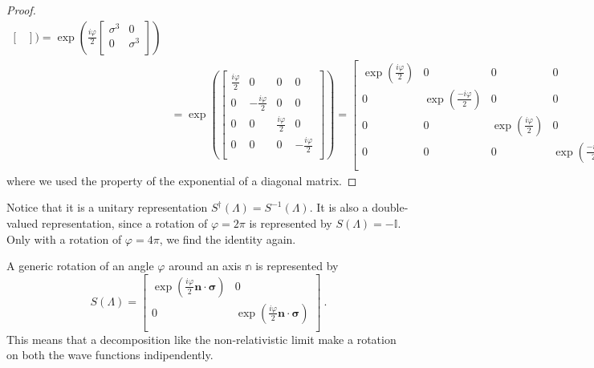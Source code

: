 \begin{example}
\begin{proof}
\begin{equation*}
\begin{aligned}
\begin{bmatrix}
                \end{bmatrix})  = \exp(\frac{i \varphi}{2} \begin{bmatrix}
                    \sigma^3 & 0 \\ 0 & \sigma^3 \\
                \end{bmatrix}) \\ & = \exp(\begin{bmatrix}
                    \frac{i \varphi}{2} & 0 & 0 & 0 \\
                    0 & - \frac{i \varphi}{2} & 0 & 0 \\
                    0 & 0 & \frac{i \varphi}{2} & 0 \\
                    0 & 0 & 0 & -\frac{i \varphi}{2} \\
                \end{bmatrix}) = \begin{bmatrix}
                    \exp(\frac{i \varphi}{2}) & 0 & 0 & 0 \\ 
                    0 & \exp(\frac{-i \varphi}{2}) & 0 & 0 \\ 
                    0 & 0 & \exp(\frac{i \varphi}{2}) & 0 \\ 
                    0 & 0 & 0 & \exp(\frac{-i \varphi}{2}) \\
                \end{bmatrix} ~,
            \end{aligned}
            \end{equation*}
            where we used the property of the exponential of a diagonal matrix.
        \end{proof}
        Notice that it is a unitary representation $S^\dagger(\Lambda) = S^{-1}(\Lambda)$. It is also a double-valued representation, since a rotation of $\varphi = 2 \pi$ is represented by $S(\Lambda) = - \mathbb I$. Only with a rotation of $\varphi = 4 \pi$, we find the identity again.
    \end{example}

    \begin{example}
        A generic rotation of an angle $\varphi$ around an axis $\mathbb n$ is represented by 
        \begin{equation*}
            S(\Lambda) = \begin{bmatrix}
                \exp(\frac{i \varphi}{2} \mathbf n \cdot \boldsymbol \sigma) & 0 \\
                0 & \exp(\frac{i \varphi}{2} \mathbf n \cdot \boldsymbol \sigma) \\
            \end{bmatrix} ~.
        \end{equation*}
        This means that a decomposition like the non-relativistic limit make a rotation on both the wave functions indipendently.
    \end{example}

